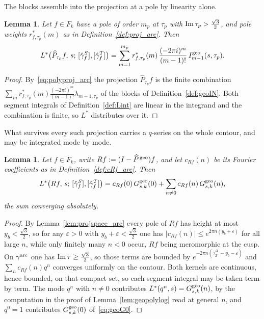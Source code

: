 \documentclass[11pt]{article}
\newtheorem{lemma}[theorem]{Lemma}
\begin{document}
The blocks assemble into the projection at a pole by linearity alone.

\begin{lemma}\label{lem:geowhole}
Let $f\in F_k$ have a pole of order $m_p$ at $\tau_p$ with ${\rm Im}\,\tau_p>\tfrac{\sqrt3}{2}$,
and pole weights $r^*_{f,\tau_p}(m)$ as in Definition~\ref{def:proj_arc}. Then
\begin{equation}\label{eq:geowhole}
L^*\big(\widehat P_{\tau_p}f,\,s;\,[\hat\gamma^S_f],[\hat\gamma^T_f]\big)
=\sum_{m=1}^{m_p}r^*_{f,\tau_p}(m)\,\frac{(-2\pi i)^{m}}{(m-1)!}\,I^{\rm geo}_{m-1}(s,\tau_p).
\end{equation}
\end{lemma}

\begin{proof}
By~\eqref{eq:polyproj_arc} the projection $\widehat P_{\tau_p}f$ is the finite combination
$\sum_{m}r^*_{f,\tau_p}(m)\frac{(-2\pi i)^{m}}{(m-1)!}\lambda_{m-1,\tau_p}$ of the blocks of
Definition~\ref{def:geoIN}. Both segment integrals of Definition~\ref{def:Lint} are linear in the
integrand and the combination is finite, so $L^*$ distributes over it.
\end{proof}

What survives every such projection carries a $q$-series on the whole contour, and may be
integrated mode by mode.

\begin{lemma}\label{lem:geotail}
Let $f\in F_k$, write $Rf:=(I-\widehat P^{\,\rm geo})f$, and let $c_{Rf}(n)$ be its Fourier
coefficients as in Definition~\ref{def:cRf_arc}. Then
\begin{equation}\label{eq:geotail}
L^*\big(Rf,\,s;\,[\hat\gamma^S_f],[\hat\gamma^T_f]\big)
=c_{Rf}(0)\,G^{\rm geo}_{s,k}(0)+\sum_{n\ne0}c_{Rf}(n)\,G^{\rm geo}_{s,k}(n),
\end{equation}
the sum converging absolutely.
\end{lemma}

\begin{proof}
By Lemma~\ref{lem:projspace_arc} every pole of $Rf$ has height at most
$y_b<\tfrac{\sqrt3}{2}$, so for any $\varepsilon>0$ with $y_b+\varepsilon<\tfrac{\sqrt3}{2}$ one
has $|c_{Rf}(n)|\le e^{2\pi n(y_b+\varepsilon)}$ for all large $n$, while only finitely many
$n<0$ occur, $Rf$ being meromorphic at the cusp. On $\gamma^{\rm arc}$ one has
${\rm Im}\,\tau\ge\tfrac{\sqrt3}{2}$, so those terms are bounded by
$e^{-2\pi n(\frac{\sqrt3}{2}-y_b-\varepsilon)}$ and $\sum_n c_{Rf}(n)q^{n}$ converges uniformly on
the contour. Both kernels are continuous, hence bounded, on that compact set, so each segment
integral may be taken term by term. The mode $q^{n}$ with $n\ne0$ contributes
$L^*(q^{n},s)=G^{\rm geo}_{s,k}(n)$, by the computation in the proof of
Lemma~\ref{lem:geopolylog} read at general $n$, and $q^{0}=1$ contributes
$G^{\rm geo}_{s,k}(0)$ of~\eqref{eq:geoG0}.
\end{proof}
\end{document}
